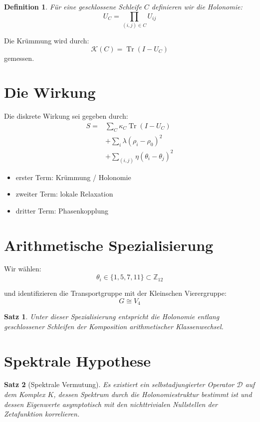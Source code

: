 \documentclass{article}
\newtheorem{definition}{Definition}
\newtheorem{satz}{Satz}
\begin{document}
	\begin{definition}
		Für eine geschlossene Schleife $C$ definieren wir die Holonomie:
		\[
		U_C = \prod_{(i,j)\in C} U_{ij}
		\]
	\end{definition}
	
	Die Krümmung wird durch:
	\[
	\mathcal{K}(C) = \operatorname{Tr}(I - U_C)
	\]
	gemessen.
	
	\section{Die Wirkung}
	
	Die diskrete Wirkung sei gegeben durch:
	\begin{align*}
		S ={} & \sum_C \kappa_C \operatorname{Tr}(I - U_C) \\
		& + \sum_i \lambda (\rho_i - \rho_0)^2 \\
		& + \sum_{(i,j)} \eta (\theta_i - \theta_j)^2
	\end{align*}
	
	\begin{itemize}
		\item erster Term: Krümmung / Holonomie
		\item zweiter Term: lokale Relaxation
		\item dritter Term: Phasenkopplung
	\end{itemize}
	
	\section{Arithmetische Spezialisierung}
	
	Wir wählen:
	\[
	\theta_i \in \{1,5,7,11\} \subset \mathbb{Z}_{12}
	\]
	
	und identifizieren die Transportgruppe mit der Kleinschen Vierergruppe:
	\[
	G \cong V_4
	\]
	
	\begin{satz}
		Unter dieser Spezialisierung entspricht die Holonomie entlang geschlossener Schleifen der Komposition arithmetischer Klassenwechsel.
	\end{satz}
	
	\section{Spektrale Hypothese}
	
	\begin{satz}[Spektrale Vermutung]
		Es existiert ein selbstadjungierter Operator $\mathcal{D}$ auf dem Komplex $K$, dessen Spektrum durch die Holonomiestruktur bestimmt ist und dessen Eigenwerte asymptotisch mit den nichttrivialen Nullstellen der Zetafunktion korrelieren.
	\end{satz}
	
\end{document}
